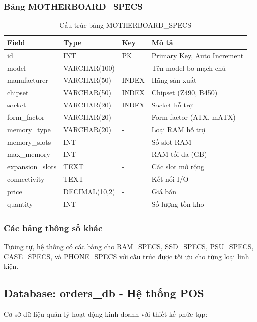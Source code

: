 \documentclass[12pt,a4paper]{article}
\begin{document}
\subsubsection{Bảng MOTHERBOARD\_SPECS}
\begin{table}[H]
\centering
\begin{tabular}{@{}llll@{}}
\toprule
\textbf{Field} & \textbf{Type} & \textbf{Key} & \textbf{Mô tả} \\
\midrule
id & INT & PK & Primary Key, Auto Increment \\
model & VARCHAR(100) & - & Tên model bo mạch chủ \\
manufacturer & VARCHAR(50) & INDEX & Hãng sản xuất \\
chipset & VARCHAR(50) & INDEX & Chipset (Z490, B450) \\
socket & VARCHAR(20) & INDEX & Socket hỗ trợ \\
form\_factor & VARCHAR(20) & - & Form factor (ATX, mATX) \\
memory\_type & VARCHAR(20) & - & Loại RAM hỗ trợ \\
memory\_slots & INT & - & Số slot RAM \\
max\_memory & INT & - & RAM tối đa (GB) \\
expansion\_slots & TEXT & - & Các slot mở rộng \\
connectivity & TEXT & - & Kết nối I/O \\
price & DECIMAL(10,2) & - & Giá bán \\
quantity & INT & - & Số lượng tồn kho \\
\bottomrule
\end{tabular}
\caption{Cấu trúc bảng MOTHERBOARD\_SPECS}
\end{table}

\subsubsection{Các bảng thông số khác}
Tương tự, hệ thống có các bảng cho RAM\_SPECS, SSD\_SPECS, PSU\_SPECS, CASE\_SPECS, và PHONE\_SPECS với cấu trúc được tối ưu cho từng loại linh kiện.

\subsection{Database: orders\_db - Hệ thống POS}
Cơ sở dữ liệu quản lý hoạt động kinh doanh với thiết kế phức tạp:
\end{document}
